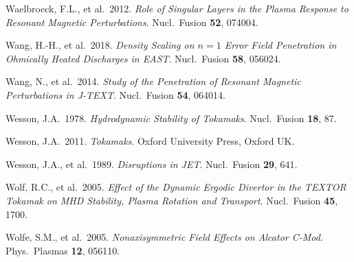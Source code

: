 \documentclass[notitlepage,12pt]{article}
\begin{document}
\begin{description}
\item Waelbroeck, F.L., et al.\ 2012. {\em Role of Singular Layers in the Plasma Response to Resonant Magnetic Perturbations}.
Nucl.\ Fusion {\bf 52}, 074004.
\item Wang, H.-H., et al.\ 2018. {\em Density Scaling on $n=1$ Error Field Penetration in Ohmically Heated Discharges in EAST}. 
Nucl.\ Fusion {\bf 58}, 056024. 
\item Wang, N., et al.\ 2014. {\em Study of the Penetration of Resonant Magnetic Perturbations in J-TEXT}. Nucl.\ Fusion {\bf 54}, 064014. 
\item Wesson, J.A.\  1978. {\em Hydrodynamic Stability of Tokamaks}. Nucl.\ Fusion {\bf 18}, 87.
\item Wesson, J.A.\ 2011. {\em Tokamaks}. Oxford University Press, Oxford UK.
\item Wesson, J.A., et al.\ 1989. {\em Disruptions in JET}. Nucl.\ Fusion {\bf 29}, 641. 
\item Wolf, R.C., et al.\ 2005. {\em Effect of the Dynamic Ergodic Divertor in the TEXTOR Tokamak on MHD Stability, Plasma Rotation and Transport}. Nucl.\ Fusion {\bf 45}, 1700. 
\item Wolfe, S.M., et al.\ 2005. {\em Nonaxisymmetric Field Effects on Alcator C-Mod}. Phys.\ Plasmas {\bf 12}, 056110. 
\end{description}
\end{document}
